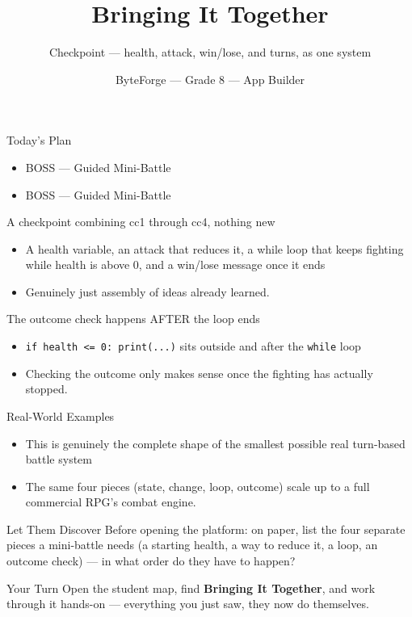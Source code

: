 \documentclass[aspectratio=169]{beamer}
\title{Bringing It Together}
\subtitle{Checkpoint — health, attack, win/lose, and turns, as one system}
\author{ByteForge --- Grade 8 --- App Builder}
\date{}
\begin{document}
\begin{frame}
    \titlepage
\end{frame}

\begin{frame}{Today's Plan}
    \begin{itemize}
        \item BOSS — Guided Mini-Battle
        \item[$\bigstar$] BOSS --- Guided Mini-Battle
    \end{itemize}
\end{frame}

\begin{frame}{A checkpoint combining cc1 through cc4, nothing new}
    \large
    \begin{itemize}
        \item A health variable, an attack that reduces it, a while loop that keeps fighting while health is above 0, and a win/lose message once it ends
        \item Genuinely just assembly of ideas already learned.
    \end{itemize}
\end{frame}


\begin{frame}{The outcome check happens AFTER the loop ends}
    \large
    \begin{itemize}
        \item \texttt{if health <= 0: print(...)} sits outside and after the \texttt{while} loop
        \item Checking the outcome only makes sense once the fighting has actually stopped.
    \end{itemize}
\end{frame}

\begin{frame}{Real-World Examples}
    \large
    \begin{itemize}
        \item This is genuinely the complete shape of the smallest possible real turn-based battle system
        \item The same four pieces (state, change, loop, outcome) scale up to a full commercial RPG's combat engine.
    \end{itemize}
\end{frame}


\begin{frame}{Let Them Discover}
    \Large
    Before opening the platform: on paper, list the four separate pieces a mini-battle needs (a starting health, a way to reduce it, a loop, an outcome check) — in what order do they have to happen?
\end{frame}

\begin{frame}{Your Turn}
    \Large
    Open the student map, find \textbf{Bringing It Together}, and work through it
    hands-on --- everything you just saw, they now do themselves.
\end{frame}
\end{document}
